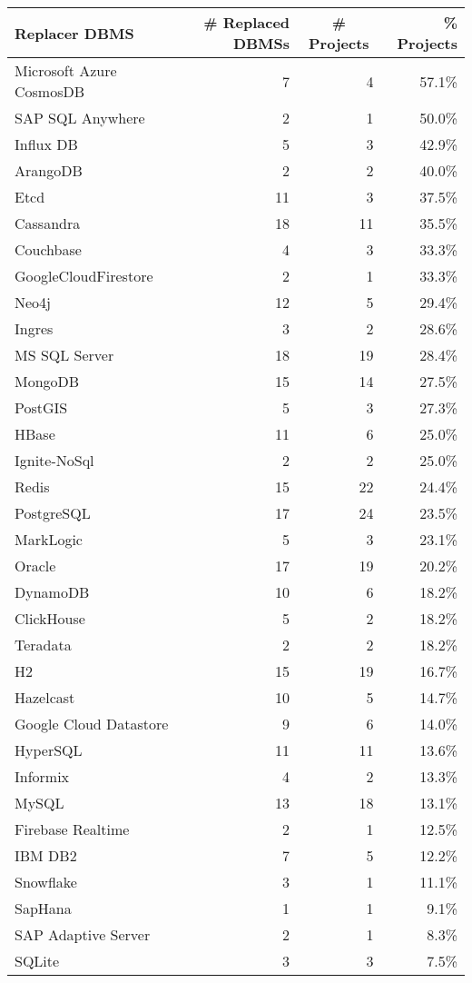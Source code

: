 \begin{tabular}{lrrr}
\hline
\multicolumn{1}{l}{\textbf{Replacer DBMS}} & \multicolumn{1}{r}{\textbf{\# Replaced DBMSs}} & \multicolumn{1}{c}{\textbf{\# Projects}} & \textbf{\% Projects} \\
\hline
Microsoft Azure CosmosDB & 7 & 4 & 57.1\% \\
SAP SQL Anywhere & 2 & 1 & 50.0\% \\
Influx DB & 5 & 3 & 42.9\% \\
ArangoDB & 2 & 2 & 40.0\% \\
Etcd & 11 & 3 & 37.5\% \\
Cassandra & 18 & 11 & 35.5\% \\
Couchbase & 4 & 3 & 33.3\% \\
GoogleCloudFirestore & 2 & 1 & 33.3\% \\
Neo4j & 12 & 5 & 29.4\% \\
Ingres & 3 & 2 & 28.6\% \\
MS SQL Server & 18 & 19 & 28.4\% \\
MongoDB & 15 & 14 & 27.5\% \\
PostGIS & 5 & 3 & 27.3\% \\
HBase & 11 & 6 & 25.0\% \\
Ignite-NoSql & 2 & 2 & 25.0\% \\
Redis & 15 & 22 & 24.4\% \\
PostgreSQL & 17 & 24 & 23.5\% \\
MarkLogic & 5 & 3 & 23.1\% \\
Oracle & 17 & 19 & 20.2\% \\
DynamoDB & 10 & 6 & 18.2\% \\
ClickHouse & 5 & 2 & 18.2\% \\
Teradata & 2 & 2 & 18.2\% \\
H2 & 15 & 19 & 16.7\% \\
Hazelcast & 10 & 5 & 14.7\% \\
Google Cloud Datastore & 9 & 6 & 14.0\% \\
HyperSQL & 11 & 11 & 13.6\% \\
Informix & 4 & 2 & 13.3\% \\
MySQL & 13 & 18 & 13.1\% \\
Firebase Realtime & 2 & 1 & 12.5\% \\
IBM DB2 & 7 & 5 & 12.2\% \\
Snowflake & 3 & 1 & 11.1\% \\
SapHana & 1 & 1 & 9.1\% \\
SAP Adaptive Server & 2 & 1 & 8.3\% \\
SQLite & 3 & 3 & 7.5\% \\
\hline
\end{tabular}
